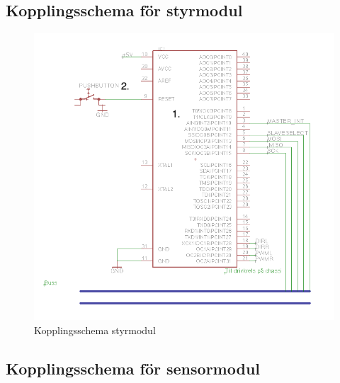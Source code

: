 \documentclass[a4paper,12pt,fleqn]{article}
\begin{document}
\subsection*{Kopplingsschema för styrmodul}

\begin{figure}[ht] %
  \begin{center}
  \includegraphics[keepaspectratio=true,width=\linewidth]{bilder/kopplingsschema_styrmodul.png}  %
  \end{center}
  \caption{Kopplingsschema styrmodul} %
  \label{fig:kopplingstyr} %
\end{figure}
 \clearpage %
 

\subsection*{Kopplingsschema för sensormodul}
\end{document}
